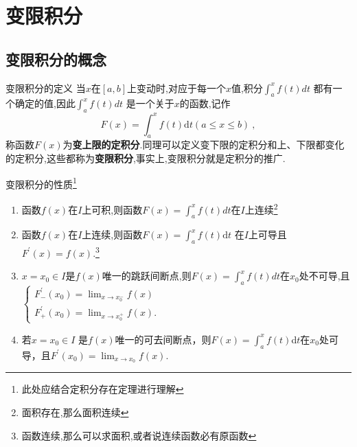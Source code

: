 \documentclass[8pt a4paper, oneside, UTF8]{ctexbook}
\begin{document}
\begin{sloppypar}
    \else
    \fi
    \chapter{变限积分}
    \section{变限积分的概念}
    \begin{defn}{变限积分的定义}{}
        当$x$在$[a,b]$上变动时,对应于每一个$x$值,积分$\int_a^xf(t)dt$ 都有一个确定的值,因此$\int_a^xf(t)dt$ 是一个关于$x$的函数,记作
        $$
            F(x)=\int_{a}^{x}f(t)\mathrm{d}t(a\leqslant x\leqslant b)\:,
        $$
        称函数$F(x)$为\textbf{变上限的定积分}.同理可以定义变下限的定积分和上、下限都变化的定积分,这些都称为\textbf{变限积分},事实上,变限积分就是定积分的推广.
    \end{defn}
    \begin{criterion}{变限积分的性质}{}\footnote{此处应结合定积分存在定理进行理解}
        \begin{enumerate}
            \item 函数$f(x)$在$I$上可积,则函数$F(x)=\int_{a}^{x}f(t)dt$在$I$上连续\footnote{面积存在,那么面积连续}
            \item 函数$f(x)$在$I$上连续,则函数$F(x)=\int_{a}^{x}f(t)\mathrm{d}t$ 在$I$上可导且$F^{\prime}(x)=f(x)$.\footnote{函数连续,那么可以求面积,或者说连续函数必有原函数}
            \item $x=x_0\in I$是$f(x)$唯一的跳跃间断点,则$F(x)=\int_a^xf(t)dt$在$x_0$处不可导,且\newline$\begin{cases}F_{-}^{\prime}(x_{0})=\lim_{x\to x^-_{0}}f(x)\\F_{+}^{\prime}(x_{0})=\lim_{x\to x^+_{0}}f(x).\end{cases}$
            \item 若$x=x_0\in I$ 是$f(x)$唯一的可去间断点，则$F(x)=\int_a^xf(t)$d$t$在$x_0$处可导，且$F^\prime(x_0)=\lim_{x\to x_0}f(x).$
        \end{enumerate}
    \end{criterion}

\end{sloppypar}
\end{document}
